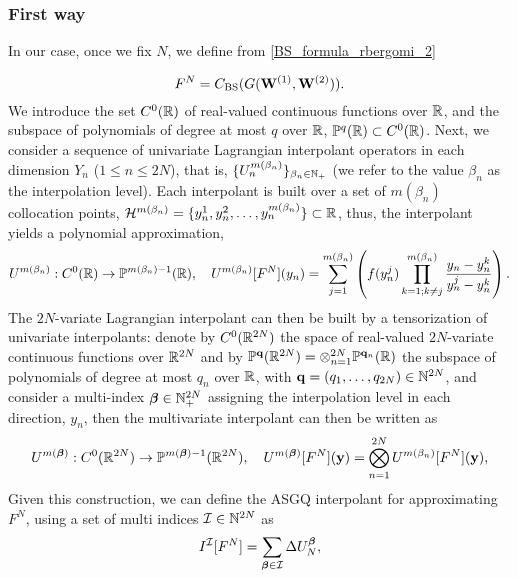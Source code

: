\subsubsection*{First way}
In our case, once we fix $N$, we define from \eqref{BS_formula_rbergomi_2}

\begin{equation*}
F^N=C_{\text{BS}}(G(\mathbf{W}^{(1)},\mathbf{W}^{(2)})) .
\end{equation*}
We introduce the set $C^0(\mathbb{R})$ of real-valued continuous functions over $\mathbb{R}$, and the subspace of polynomials of degree at most $q$ over $\mathbb{R}$, $\mathbb{P}^q(\mathbb{R}) \subset C^0(\mathbb{R})$. Next,
we consider a sequence of univariate Lagrangian interpolant operators in each dimension $Y_n$ ($1 \le n \le 2N$), that is, $\{U_n^{m(\beta_n)}\}_{\beta_n \in \mathbb{N}_+}$ (we refer to the value $\beta_n$ as the interpolation level). Each interpolant is built over a set of $m(\beta_n)$ collocation points, $\mathcal{H}^{m(\beta_n)}=\{y^1_n,y^2_n,\dots,y^{m(\beta_n)}_n\} \subset \mathbb{R}$, thus, the interpolant yields a polynomial approximation,
\begin{equation*}
U^{m(\beta_n)}:C^0(\mathbb{R}) \rightarrow \mathbb{P}^{m(\beta_n)-1}(\mathbb{R}), \quad U^{m(\beta_n)}[F^N](y_n)= \sum_{j=1}^{m(\beta_n)} \left( f(y^j_n) \prod_{k=1;k \neq j}^{m(\beta_n)} \frac{y_n-y_n^k}{y_n^j-y_n^k}\right) .
\end{equation*}
The $2N$-variate Lagrangian interpolant can then be built by a tensorization of univariate interpolants: denote by $C^0(\mathbb{R}^{2N})$ the space of real-valued $2N$-variate continuous functions over $\mathbb{R}^{2N}$ and by $\mathbb{P}^{\mathbf{q}}(\mathbb{R}^{2N}) = \otimes_{n=1}^{2N} \mathbb{P}^{\mathbf{q}_n}(\mathbb{R})$ the subspace of polynomials of degree at most $q_n$ over $\mathbb{R}$, with $\mathbf{q}=(q_1,\dots,q_{2N})\in  \mathbb{N}^{2N}$, and consider a multi-index $\boldsymbol{\beta} \in \mathbb{N}^{2N}_+$ assigning the interpolation level in each direction, $y_n$, then  the multivariate interpolant can then be written as
$$U^{m(\boldsymbol{\beta})}: C^0(\mathbb{R}^{2N}) \rightarrow \mathbb{P}^{m(\boldsymbol{\beta})-1}(\mathbb{R}^{2N}) ,\quad  U^{m(\boldsymbol{\beta})}[F^N](\mathbf{y})= \bigotimes_{n = 1}^{2N} U^{m(\beta_n)} [F^N](\mathbf{y}) , $$
Given this construction, we can define the ASGQ interpolant  for approximating $F^N$, using a set of multi indices $\mathcal{I} \in \mathbb{N}^{2N}$ as
\begin{equation}
I^{\mathcal{I}}[F^N]= \sum_{\boldsymbol{\beta} \in \mathcal{I}} \Delta U_N^{\boldsymbol{\beta}} ,
\end{equation}

